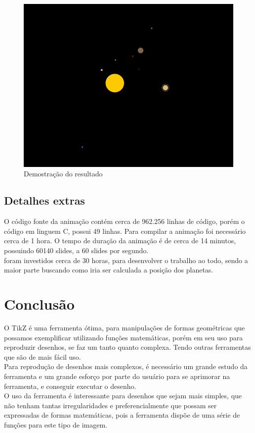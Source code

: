 \documentclass[
	12pt,				%
	openright,			%
	oneside,
	a4paper,			%
	english,			%
	french,				%
	spanish,			%
	brazil,				%
	]{abntex2}
\begin{document}
	\begin{figure}[h]
		\centering
		\includegraphics[width=0.5\linewidth]{screenshot004}
		\caption{Demostração do resultado}
		\label{fig:screenshot004}
	\end{figure}
	
	
\section{Detalhes extras}
	O código fonte da animação contém cerca de 962.256 linhas de código, porém o código em linguem C, possui 49 linhas. Para compilar a animação foi necessário cerca de 1 hora. O tempo de duração da animação é de cerca de 14 minutos, possuindo 60140 slides, a 60 slides por segundo.
	\\ \indent foram investidos cerca de 30 horas, para desenvolver o trabalho ao todo, sendo a maior parte buscando como iria ser calculada a posição dos planetas.

\chapter[Conclusão]{Conclusão}
	O TikZ é uma ferramenta ótima, para manipulações de formas geométricas que possamos exemplificar utilizando funções matemáticas, porém em seu uso para reproduzir desenhos, se faz um tanto quanto complexa. Tendo outras ferramentas que são de mais fácil uso.
	\\ \indent Para reprodução de desenhos mais complexos, é necessário um grande estudo da ferramenta e um grande esforço por parte do usuário para se aprimorar na ferramenta, e conseguir executar o desenho.
	\\ \indent O uso da ferramenta é interessante para desenhos que sejam mais simples, que não tenham tantas irregularidades e preferencialmente que possam ser expressadas de formas matemáticas, pois a ferramenta dispõe de uma série de funções para este tipo de imagem.

\postextual


\end{document}
